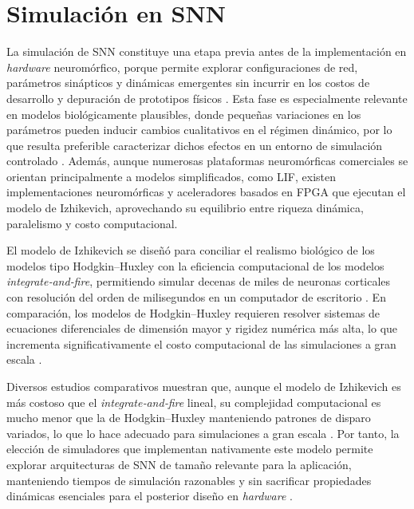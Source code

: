 

\section{Simulación en SNN}

La simulación de SNN constituye una etapa previa antes de la implementación en \textit{hardware} neuromórfico, porque permite explorar configuraciones de red, parámetros sinápticos y dinámicas emergentes sin incurrir en los costos de desarrollo y depuración de prototipos físicos \cite{Dinkelbach2022annarchy, Izhikevich2003}. Esta fase es especialmente relevante en modelos biológicamente plausibles, donde pequeñas variaciones en los parámetros pueden inducir cambios cualitativos en el régimen dinámico, por lo que resulta preferible caracterizar dichos efectos en un entorno de simulación controlado \cite{Izhikevich2003}. Además, aunque numerosas plataformas neuromórficas comerciales se orientan principalmente a modelos simplificados, como LIF, existen implementaciones neuromórficas y aceleradores basados en FPGA que ejecutan el modelo de Izhikevich, aprovechando su equilibrio entre riqueza dinámica, paralelismo y costo computacional.

El modelo de Izhikevich se diseñó para conciliar el realismo biológico de los modelos tipo Hodgkin–Huxley con la eficiencia computacional de los modelos \textit{integrate‑and‑fire}, permitiendo simular decenas de miles de neuronas corticales con resolución del orden de milisegundos en un computador de escritorio \cite{Izhikevich2003}. En comparación, los modelos de Hodgkin–Huxley requieren resolver sistemas de ecuaciones diferenciales de dimensión mayor y rigidez numérica más alta, lo que incrementa significativamente el costo computacional de las simulaciones a gran escala \cite{Skocik2014neuronmodels}.

Diversos estudios comparativos muestran que, aunque el modelo de Izhikevich es más costoso que el \textit{integrate‑and‑fire} lineal, su complejidad computacional es mucho menor que la de Hodgkin–Huxley manteniendo patrones de disparo variados, lo que lo hace adecuado para simulaciones a gran escala \cite{Izhikevich2004spikingmodel, Izhikevich2003}. Por tanto, la elección de simuladores que implementan nativamente este modelo permite explorar arquitecturas de SNN de tamaño relevante para la aplicación, manteniendo tiempos de simulación razonables y sin sacrificar propiedades dinámicas esenciales para el posterior diseño en \textit{hardware} \cite{Izhikevich2003}.

